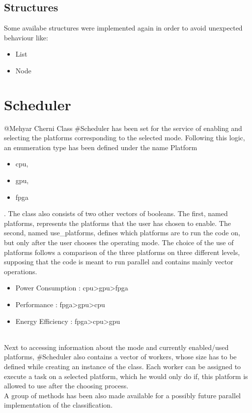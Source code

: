 \documentclass[parskip=full]{scrartcl}
\newcommand\tab[1][1cm]{\hspace*{#1}}
\begin{document}
	\subsection{Structures} \label{Structures}
		\tab Some availabe structures were implemented again in order to avoid unexpected behaviour like:
		\begin{itemize}
			\item List
			\item Node
		\end{itemize} 
		
\pagebreak

\section{Scheduler} \label{Scheduler}
	@Mehyar Cherni
	\tab Class #Scheduler has been set for the service of enabling and selecting the platforms corresponding to the selected mode. Following this logic, an enumeration type has been defined under the name Platform { 
	\begin {itemize}
		\item cpu, 
		\item gpu, 
		\item fpga
	\end{itemize}
	}. The class also consists of two other vectors of booleans. The first, named platforms, represents the platforms that the user has chosen to enable. The second, named use_platforms, defines which platforms are to run the code on, but only after the user chooses the operating mode. The choice of the use of platforms follows a comparison of the three platforms on three different levels, supposing that the code is meant to run parallel and contains mainly vector operations. 
	\begin {itemize}
		\item Power Consumption : cpu>gpu>fpga
		\item Performance : fpga>gpu>cpu
		\item Energy Efficiency : fpga>cpu>gpu
	\end{itemize}
\\ Next to accessing information about the mode and currently enabled/used platforms, #Scheduler also contains a vector of workers, whose size has to be defined while creating an instance of the class. Each worker can be assigned to execute a task on a selected platform, which he would only do if, this platform is allowed to use after the choosing process. \\A group of methods has been also made available for a possibly future parallel implementation of the classification.
\end{document}
